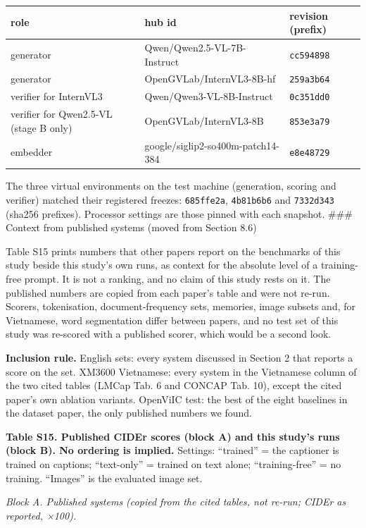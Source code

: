 \begin{longtable}[]{@{}lll@{}}
\toprule\noalign{}
role & hub id & revision (prefix) \\
\midrule\noalign{}
\endhead
\bottomrule\noalign{}
\endlastfoot
generator & Qwen/Qwen2.5-VL-7B-Instruct & \texttt{cc594898} \\
generator & OpenGVLab/InternVL3-8B-hf & \texttt{259a3b64} \\
verifier for InternVL3 & Qwen/Qwen3-VL-8B-Instruct & \texttt{0c351dd0} \\
verifier for Qwen2.5-VL (stage B only) & OpenGVLab/InternVL3-8B & \texttt{853e3a79} \\
embedder & google/siglip2-so400m-patch14-384 & \texttt{e8e48729} \\
\end{longtable}

The three virtual environments on the test machine (generation, scoring and verifier) matched their
registered freezes: \texttt{685ffe2a}, \texttt{4b81b6b6} and \texttt{7332d343} (sha256 prefixes).
Processor settings are those pinned with each snapshot. \#\#\# Context from published systems (moved
from Section 8.6)

Table S15 prints numbers that other papers report on the benchmarks of this study beside this
study's own runs, as context for the absolute level of a training-free prompt. It is not a ranking,
and no claim of this study rests on it. The published numbers are copied from each paper's table and
were not re-run. Scorers, tokenisation, document-frequency sets, memories, image subsets and, for
Vietnamese, word segmentation differ between papers, and no test set of this study was re-scored
with a published scorer, which would be a second look.

\textbf{Inclusion rule.} English sets: every system discussed in Section 2 that reports a score on
the set. XM3600 Vietnamese: every system in the Vietnamese column of the two cited tables (LMCap
Tab. 6 and CONCAP Tab. 10), except the cited paper's own ablation variants. OpenViIC test: the best
of the eight baselines in the dataset paper, the only published numbers we found.

\textbf{Table S15. Published CIDEr scores (block A) and this study's runs (block B). No ordering is
implied.} Settings: ``trained'' = the captioner is trained on captions; ``text-only'' = trained on
text alone; ``training-free'' = no training. ``Images'' is the evaluated image set.

\emph{Block A. Published systems (copied from the cited tables, not re-run; CIDEr as reported,
×100).}

